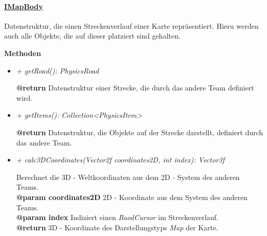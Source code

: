     
    
         \paragraph{\underline{IMapBody}} \mbox{}\par
         Datenstruktur, die einen Streckenverlauf einer Karte repräsentiert. Hieru werden auch alle Objekte, die auf dieser 
         platziert sind gehalten.\par
            
            \textbf{Methoden}					
            \begin{itemize}
                \item  \textit{+ getRoad(): PhysicsRoad}
                \begin{leftbar}[0.9\linewidth]
                        \textbf{@return} Datenstruktur einer Strecke, die durch das andere Team definiert wird.
                    \end{leftbar}
                    
                    \item  \textit{+ getItems(): Collection<PhysicsItem>}
                    \begin{leftbar}[0.9\linewidth]
                        \textbf{@return} Datenstruktur, die Objekte auf der Strecke darstellt, definiert durch das andere Team.
                    \end{leftbar}    
                    
                    \item  \textit{+ calc3DCoordinates(Vector2f coordinates2D, int index): Vector3f}
                    \begin{leftbar}[0.9\linewidth]
                        Berechnet die 3D - Weltkoordinaten aus dem 2D - System des anderen Teams.\\
                        \textbf{@param coordinates2D} 2D - Koordinate aus dem System des anderen Teams.\\
                        \textbf{@param index} Indiziert einen \textit{RaodCursor} im Streckenverlauf.\\
                        \textbf{@return} 3D - Koordinate des Darstellungstyps \textit{Map} der Karte.
                    \end{leftbar}
                    

\end{itemize}
